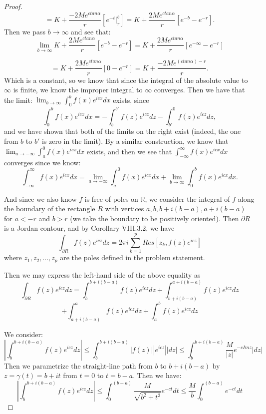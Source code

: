 \documentclass[10pt]{article}
\begin{document}
\begin{proof}
\[=K + \frac{-2Me^{ctan\alpha}}{r}\left[ e^{-t}\Big|_r^b\right] = K + \frac{2Me^{ctan\alpha}}{r}\left[ e^{-b} - e^{-r}\right]. \]
Then we pass $b \to \infty$ and see that: 
\[\lim_{b \to \infty} K + \frac{2Me^{ctan\alpha}}{r}\left[ e^{-b} - e^{-r}\right] = K + \frac{2Me^{ctan\alpha}}{r}\left[ e^{-\infty} - e^{-r}\right] \]

\[= K + \frac{2Me^{ctan\alpha}}{r}\left[ 0 - e^{-r}\right] = K + \frac{-2Me^{(ctan\alpha) - r}}{r}. \]
Which is a constant, so we know that since the integral of the absolute value to $\infty$ is finite, we know the improper integral to $\infty$ converges. Then we have that the limit: $\lim_{b \to \infty}\int_0^bf(x)e^{icx}dx$  exists, since 
\[\int_0^bf(x)e^{icx}dx =  - \int_b^{b'}f(z)e^{icz}dz - \int_{b'}^0 f(z)e^{icz}dz, \]
and we have shown that both of the limits on the right exist (indeed, the one from $b$ to $b'$ is zero in the limit). By a similar construction, we know that $\lim_{a \to -\infty}\int_{a}^0 f(x)e^{icx}dx$ exists, and then we see that $\int_{-\infty}^\infty f(x)e^{icx}dx$ converges since we know: 
\[\int_{-\infty}^\infty f(x)e^{icx}dx  = \lim_{a \to -\infty}\int_{a}^0 f(x)e^{icx}dx  + \lim_{b \to \infty}\int_{0}^b f(x)e^{icx}dx. \]





And since we also know $f$ is free of poles on $\mathbb{R}$, we consider the integral of $f$ along the boundary of the rectangle $R$ with vertices $a,b,b+i(b-a),a+i(b-a)$ for $a < -r$ and $b > r$ (we take the boundary to be positively oriented). Then $\partial R$ is a Jordan contour, and by Corollary VIII.3.2, we have
\[\int_{\partial R} f(z)e^{icz}dz = 2 \pi i \sum_{k = 1}^p Res[z_k,f(z)e^{icz}]\]
where $z_1,z_2, ...,z_p$ are the poles defined in the problem statement.





Then we may express the left-hand side of the above equality as 
\[\int_{\partial R} f(z)e^{icz}dz = \int_{b}^{b+i(b-a)} f(z)e^{icz}dz + \int_{b+i(b-a)}^{a+i(b-a)} f(z)e^{icz}dz \]
\[+ \int_{a+i(b-a)}^{a} f(z)e^{icz} dz+  \int_{a}^{b} f(z)e^{icz}dz\]


We consider: 
\[\left|\int_{b}^{b+i(b-a)} f(z)e^{icz}dz\right| \leq \int_{b}^{b+i(b-a)} |f(z)||e^{icz}||dz| \leq \int_{b}^{b+i(b-a)}\frac{M}{|z|} e^{-cImz}|dz|\]
Then we parametrize the straight-line path from $b$ to $b+i(b-a)$ by $z = \gamma(t) = b + it$ from $t = 0$ to $t = b-a$. Then we have: 
\[\left|\int_{b}^{b+i(b-a)} f(z)e^{icz}dz\right| \leq \int_{0}^{(b-a)}\frac{M}{\sqrt{b^2 + t^2}} e^{-ct}dt \leq \frac{M}{b} \int_{0}^{(b-a)} e^{-ct}dt\]


\end{proof}
\end{document}
